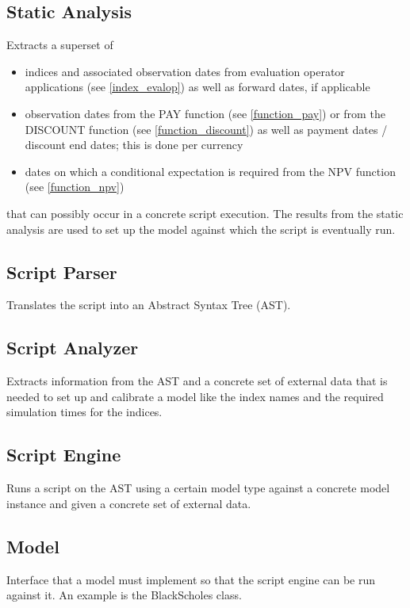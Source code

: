 \subsection{Static Analysis}\label{static_analysis}

Extracts a superset of

\begin{itemize}
\item indices and associated observation dates from evaluation operator applications (see \ref{index_evalop}) as well as
  forward dates, if applicable
\item observation dates from the PAY function (see \ref{function_pay}) or from the DISCOUNT function (see
  \ref{function_discount}) as well as payment dates / discount end dates; this is done per currency
\item dates on which a conditional expectation is required from the NPV function (see \ref{function_npv})
\end{itemize}

that can possibly occur in a concrete script execution. The results from the static analysis are used to set up the
model against which the script is eventually run.

\subsection{Script Parser}

Translates the script into an Abstract Syntax Tree (AST).

\subsection{Script Analyzer}

Extracts information from the AST and a concrete set of external data that is needed to set up and calibrate a model
like the index names and the required simulation times for the indices.

\subsection{Script Engine}

Runs a script on the AST using a certain model type against a concrete model instance and given a concrete set of
external data.

\subsection{Model}

Interface that a model must implement so that the script engine can be run against it. An example is the BlackScholes
class.
